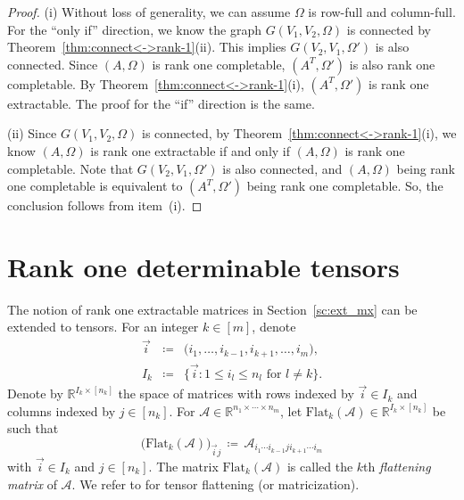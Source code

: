 \documentclass{amsart}
\newcommand{\re}{\mathbb{R}}
\newcommand{\mc}[1]{\mathcal{#1}}
\newcommand{\ddd}{,\ldots,}
\newcommand{\Flat}{\mbox{Flat}}
\newcommand{\be}{\begin{equation}}
\newcommand{\ee}{\end{equation}}
\theoremstyle{definition}
\numberwithin{equation}{section}
\begin{document}
\begin{proof}
(i) Without loss of generality, we can assume $\Omega$ is row-full and column-full.
For the ``only if'' direction, we know the graph $G(V_1, V_2, \Omega)$ is connected by Theorem~\ref{thm:connect<->rank-1}(ii).
This implies $G(V_2, V_1, \Omega')$ is also connected.
Since $(A, \Omega)$ is rank one completable, $(A^T, \Omega')$ is also rank one completable.
By Theorem~\ref{thm:connect<->rank-1}(i), $(A^T, \Omega')$ is rank one extractable.
The proof for the ``if'' direction is the same.



\noindent (ii) Since $G(V_1, V_2, \Omega)$ is connected,
by Theorem~\ref{thm:connect<->rank-1}(i),
we know
$(A, \Omega)$ is rank one extractable if and only if $(A, \Omega)$ is rank one completable.
Note that $G(V_2, V_1, \Omega')$ is also connected,
and $(A, \Omega)$ being rank one completable is equivalent to $(A^T, \Omega')$ being rank one completable.
So, the conclusion follows from item~(i).
\end{proof}












\section{Rank one determinable tensors}\label{sc:det_tensor}

The notion of rank one extractable matrices in Section~\ref{sc:ext_mx} can be extended to tensors.
For an integer $k \in [m]$, denote 
\begin{eqnarray}
\label{vec_i}
\vec{i}  & \coloneqq & \big( i_1 \ddd i_{k-1}, i_{k+1} \ddd i_m \big),   \\
\label{I_k}
I_k  & \coloneqq & \big\{ \vec{i} : 1 \le i_l \le n_l \text{ for }l \ne k \big\}.
\end{eqnarray}
Denote by $\re^{ I_k \times [n_k] }$ the space of matrices with rows indexed by $\vec{i} \in I_k$
and columns indexed by $j \in [n_k]$.
For $\mc{A} \in \re^{n_1 \times \cdots \times n_m}$, 
let $\Flat_k(\mc{A}) \in \re^{ I_k \times [n_k] }$ be such that
\be\label{flat_k}
\big( \Flat_k(\mc{A}) \big)_{\vec{i} j} \,\coloneqq\, \mc{A}_{i_1 \cdots i_{k-1} j i_{k+1} \cdots i_m}
\ee
with $\vec{i} \in I_k$ and $j \in [n_k]$.
The matrix $\Flat_k(\mc{A})$ is called the $k$th {\it flattening matrix} of $\mc{A}$.
We refer to \cite{KolBad09} for tensor flattening (or matricization).
\end{document}
